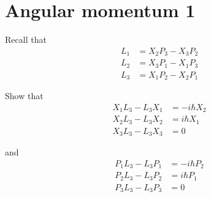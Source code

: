 

\section*{Angular momentum 1}

Recall that
\begin{align*}
L_1&=X_2P_3-X_3P_2
\\
L_2&=X_3P_1-X_1P_3
\\
L_3&=X_1P_2-X_2P_1
\end{align*}

Show that
\begin{align*}
X_1L_3-L_3X_1&=-i\hbar X_2
\\
X_2L_3-L_3X_2&=i\hbar X_1
\\
X_3L_3-L_3X_3&=0
\end{align*}

and
\begin{align*}
P_1L_3-L_3P_1&=-i\hbar P_2
\\
P_2L_3-L_3P_2&=i\hbar P_1
\\
P_3L_3-L_3P_3&=0
\end{align*}


